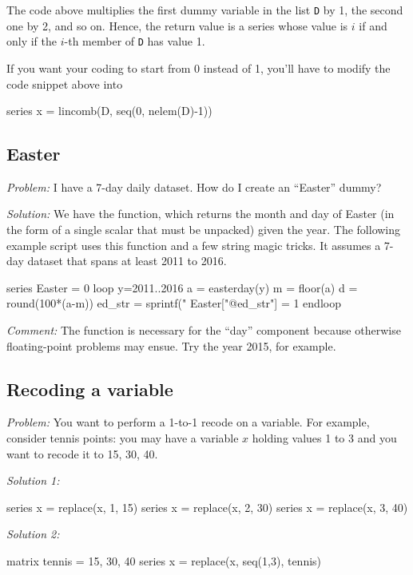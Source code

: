 The code above multiplies the first dummy variable in the list
\texttt{D} by 1, the second one by 2, and so on. Hence, the return
value is a series whose value is $i$ if and only if the $i$-th member
of \texttt{D} has value 1.

If you want your coding to start from 0 instead of 1, you'll have to
modify the code snippet above into
\begin{code}
series x = lincomb(D, seq(0, nelem(D)-1))
\end{code}

\subsection{Easter}

\emph{Problem:} I have a 7-day daily dataset. How do I create an
``Easter'' dummy?

\emph{Solution:} We have the  function, which returns
the month and day of Easter (in the form of a single scalar that must
be unpacked) given the year. The following example script uses this
function and a few string magic tricks. It assumes a 7-day dataset
that spans at least 2011 to 2016.

\begin{code}
series Easter = 0
loop y=2011..2016
    a = easterday(y)
    m = floor(a)
    d = round(100*(a-m))
    ed_str = sprintf("%
    Easter["@ed_str"] = 1
endloop
\end{code}

\emph{Comment:} The  function is necessary for the
``day'' component because otherwise floating-point problems may
ensue. Try the year 2015, for example.

\subsection{Recoding a variable}

\emph{Problem:} You want to perform a 1-to-1 recode on a variable. For
example, consider tennis points: you may have a variable $x$ holding
values 1 to 3 and you want to recode it to 15, 30, 40.

\emph{Solution 1:}
\begin{code}
series x = replace(x, 1, 15)
series x = replace(x, 2, 30)
series x = replace(x, 3, 40)
\end{code}

\emph{Solution 2:}
\begin{code}
matrix tennis = {15, 30, 40}
series x = replace(x, seq(1,3), tennis)
\end{code}

